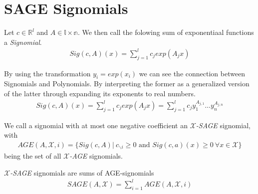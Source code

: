 \documentclass[./main.tex]{subfiles}
\begin{document}
\section{SAGE Signomials}
\begin{ddef}[Signomial]
Let $c \in \mathbb{R}^l$ and $A \in \mathbb{l\times n}$. We then call the folowing sum of exponentiaal functions a \emph{Signomial}.
\begin{align*}
Sig(c,A)(x) = \sum_{j=1}^l c_j exp(A_jx)
\end{align*}
\end{ddef}
By using the transformation $y_i=exp(x_i)$ we can see the connection between Signomials and Polynomials. By interpreting the former as a generalized version of the latter through expanding its exponents to real numbers.
\begin{align*}
Sig(c,A)(x) = \sum_{j=1}^l c_j exp(A_jx) = \sum_{j=1}^l c_j y_1^{A_{j,1}} \dots y_n^{A_{j,n}}
\end{align*}
\begin{ddef}
We call a signomial with at most one negative coefficient an \emph{$\mathcal{X}$-SAGE} signomial,  with
\begin{align*}
AGE(A,\mathcal{X}, i) = \lbrace Sig(c,A) | \ c_{\backslash i} \geq 0 \text{ and } Sig(c,a)(x) \geq 0 \ \forall x \in \mathcal{X} \rbrace
\end{align*}
being the set of all \emph{$\mathcal{X}$-AGE} signomials.
\end{ddef}
\begin{ddef}
\emph{$\mathcal{X}$-SAGE} signomials are sums of AGE-signomials
\begin{align*}
SAGE(A,\mathcal{X}) = \sum_{i=1}^l AGE(A,\mathcal{X},i)
\end{align*}

\end{ddef}
\end{document}
